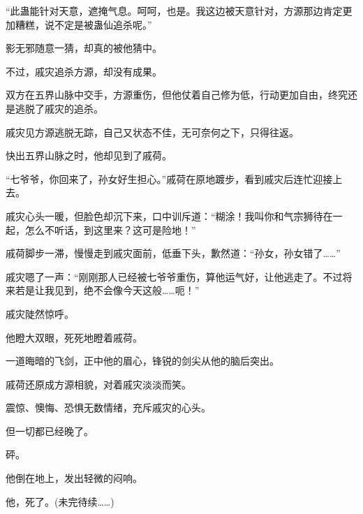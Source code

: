 \begin{this_body}
“此蛊能针对天意，遮掩气息。呵呵，也是。我这边被天意针对，方源那边肯定更加糟糕，说不定是被蛊仙追杀呢。”

影无邪随意一猜，却真的被他猜中。

不过，戚灾追杀方源，却没有成果。

双方在五界山脉中交手，方源重伤，但他仗着自己修为低，行动更加自由，终究还是逃脱了戚灾的追杀。

戚灾见方源逃脱无踪，自己又状态不佳，无可奈何之下，只得往返。

快出五界山脉之时，他却见到了戚荷。

“七爷爷，你回来了，孙女好生担心。”戚荷在原地踱步，看到戚灾后连忙迎接上去。

戚灾心头一暖，但脸色却沉下来，口中训斥道：“糊涂！我叫你和气宗狮待在一起，怎么不听话，到这里来？这可是险地！”

戚荷脚步一滞，慢慢走到戚灾面前，低垂下头，歉然道：“孙女，孙女错了……”

戚灾嗯了一声：“刚刚那人已经被七爷爷重伤，算他运气好，让他逃走了。不过将来若是让我见到，绝不会像今天这般……呃！”

戚灾陡然惊呼。

他瞪大双眼，死死地瞪着戚荷。

一道晦暗的飞剑，正中他的眉心，锋锐的剑尖从他的脑后突出。

戚荷还原成方源相貌，对着戚灾淡淡而笑。

震惊、懊悔、恐惧无数情绪，充斥戚灾的心头。

但一切都已经晚了。

砰。

他倒在地上，发出轻微的闷响。

他，死了。(未完待续……)

\end{this_body}

